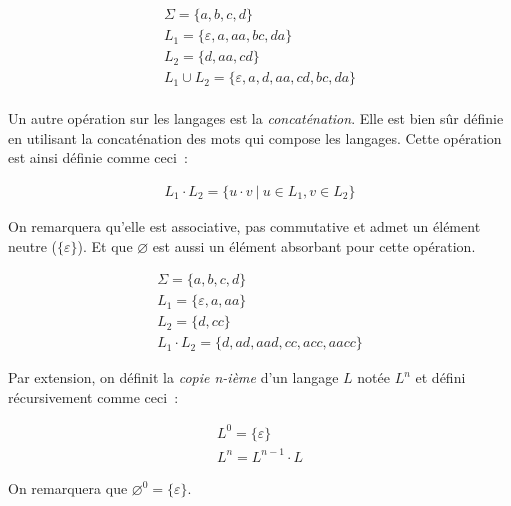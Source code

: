 
\begin{example}
    \begin{gather*}
        \Sigma = \{a, b, c, d\} \\
        L_1 = \{\varepsilon, a, aa, bc, da\} \\
        L_2 = \{d, aa, cd\} \\
        L_1 \cup L_2 = \{\varepsilon, a, d, aa, cd, bc, da\} \\
    \end{gather*}
\end{example}

\begin{definition}
    Un autre opération sur les langages est la \textit{concaténation}. Elle est
    bien sûr définie en utilisant la concaténation des mots qui compose les
    langages. Cette opération est ainsi définie comme ceci~:

    \begin{gather*}
        L_1 \cdot L_2 = \{u \cdot v ~|~ u \in L_1, v \in L_2\}
    \end{gather*}

    \noindent On remarquera qu'elle est associative, pas commutative et admet un
    élément neutre (\(\{\varepsilon\}\)). Et que \(\varnothing\) est aussi un
    élément absorbant pour cette opération.
\end{definition}

\begin{example}
    \begin{gather*}
        \Sigma = \{a, b, c, d\} \\
        L_1 = \{\varepsilon, a, aa\} \\
        L_2 = \{d, cc\} \\
        L_1 \cdot L_2 = \{d, ad, aad, cc, acc, aacc\}
    \end{gather*}
\end{example}

\begin{definition}
    Par extension, on définit la \textit{copie n-ième} d'un langage \(L\) notée
    \(L^n\) et défini récursivement comme ceci~:

    \begin{gather*}
        L^0 = \{\varepsilon\} \\
        L^n = L^{n - 1} \cdot L
    \end{gather*}

    \noindent On remarquera que \(\varnothing^0 = \{\varepsilon\}\).
\end{definition}

